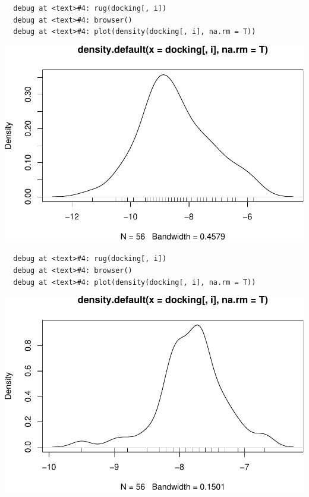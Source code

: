 \documentclass[12pt,twoside]{reedthesis}
\begin{document}
  \begin{verbatim}
  debug at <text>#4: rug(docking[, i])
  debug at <text>#4: browser()
  debug at <text>#4: plot(density(docking[, i], na.rm = T))
  \end{verbatim}
  
  \begin{center}\includegraphics{tesis_files/figure-latex/johan-18} \end{center}
  
  \begin{verbatim}
  debug at <text>#4: rug(docking[, i])
  debug at <text>#4: browser()
  debug at <text>#4: plot(density(docking[, i], na.rm = T))
  \end{verbatim}
  
  \begin{center}\includegraphics{tesis_files/figure-latex/johan-19} \end{center}
  
\end{document}
